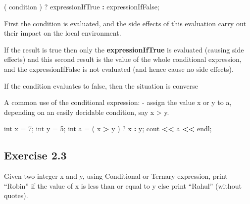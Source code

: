 \documentclass[
]{article}
\newenvironment{Shaded}{\begin{snugshade}}{\end{snugshade}}
\newcommand{\DecValTok}[1]{\textcolor[rgb]{0.00,0.00,0.81}{#1}}
\newcommand{\ErrorTok}[1]{\textcolor[rgb]{0.64,0.00,0.00}{\textbf{#1}}}
\newcommand{\NormalTok}[1]{#1}
\newcommand{\OtherTok}[1]{\textcolor[rgb]{0.56,0.35,0.01}{#1}}
\newcommand{\SpecialCharTok}[1]{\textcolor[rgb]{0.81,0.36,0.00}{\textbf{#1}}}
\begin{document}
\begin{Shaded}
\begin{Highlighting}[]
\NormalTok{( condition ) ? expressionIfTrue }\SpecialCharTok{:}\NormalTok{ expressionIfFalse;}
\end{Highlighting}
\end{Shaded}

First the condition is evaluated, and the side effects of this
evaluation carry out their impact on the local environment.

If the result is true then only the \textbf{expressionIfTrue} is
evaluated (causing side effects) and this second result is the value of
the whole conditional expression, and the expressionIfFalse is not
evaluated (and hence cause no side effects).

If the condition evaluates to false, then the situation is converse

A common use of the conditional expression: - assign the value x or y to
a, depending on an easily decidable condition, say x \textgreater{} y.

\begin{Shaded}
\begin{Highlighting}[]
\NormalTok{int x }\OtherTok{=} \DecValTok{7}\NormalTok{;}
\NormalTok{int y }\OtherTok{=} \DecValTok{5}\NormalTok{;}
\NormalTok{int a }\OtherTok{=}\NormalTok{ ( x }\SpecialCharTok{\textgreater{}}\NormalTok{ y ) ? x }\SpecialCharTok{:}\NormalTok{ y;}
\NormalTok{cout }\SpecialCharTok{\textless{}}\ErrorTok{\textless{}}\NormalTok{ a }\SpecialCharTok{\textless{}}\ErrorTok{\textless{}}\NormalTok{ endl;}
\end{Highlighting}
\end{Shaded}

\subsection{Exercise 2.3}\label{exercise-2.3}

Given two integer x and y, using Conditional or Ternary expression,
print ``Robin'' if the value of x is less than or equal to y else print
``Rahul'' (without quotes).
\end{document}

